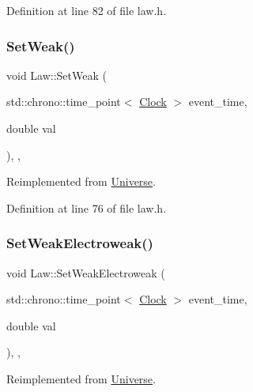Definition at line 82 of file law.\+h.

\mbox{\label{class_law_a1009b4e0bc0b91f41d48dc137529e97b}} 
\subsubsection{\texorpdfstring{Set\+Weak()}{SetWeak()}}
{\footnotesize\ttfamily void Law\+::\+Set\+Weak (\begin{DoxyParamCaption}\item[{std\+::chrono\+::time\+\_\+point$<$ \hyperlink{universe_8h_a0ef8d951d1ca5ab3cfaf7ab4c7a6fd80}{Clock} $>$}]{event\+\_\+time,  }\item[{double}]{val }\end{DoxyParamCaption})\hspace{0.3cm}{\ttfamily [inline]}, {\ttfamily [final]}, {\ttfamily [virtual]}}



Reimplemented from \hyperlink{class_universe_a0f5cd04081b41ee931c0557dc397f6fb}{Universe}.



Definition at line 76 of file law.\+h.

\mbox{\label{class_law_a65e5e757041c1e72bb046eccbb6d66db}} 
\subsubsection{\texorpdfstring{Set\+Weak\+Electroweak()}{SetWeakElectroweak()}}
{\footnotesize\ttfamily void Law\+::\+Set\+Weak\+Electroweak (\begin{DoxyParamCaption}\item[{std\+::chrono\+::time\+\_\+point$<$ \hyperlink{universe_8h_a0ef8d951d1ca5ab3cfaf7ab4c7a6fd80}{Clock} $>$}]{event\+\_\+time,  }\item[{double}]{val }\end{DoxyParamCaption})\hspace{0.3cm}{\ttfamily [inline]}, {\ttfamily [final]}, {\ttfamily [virtual]}}



Reimplemented from \hyperlink{class_universe_a2d3d642bfdc863248e93535832fa4b00}{Universe}.



